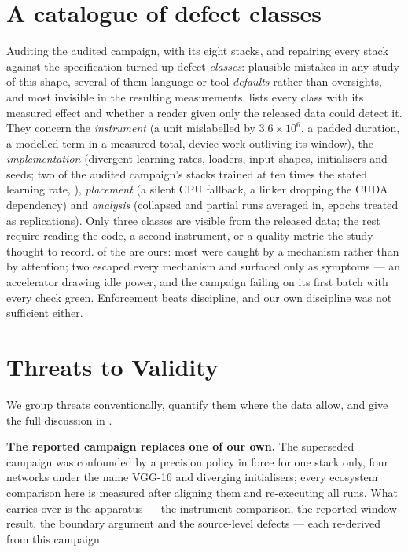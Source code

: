 \section{A catalogue of defect classes}
\label{sec:catalogue}

Auditing the audited campaign, with its eight stacks, and repairing every stack against the
specification turned up \vDefectCount{} defect \emph{classes}: plausible
mistakes in any study of this shape, several of them language or tool
\emph{defaults} rather than oversights, and most invisible in the resulting
measurements.  lists every class with its
measured effect and whether a reader given only the released data could detect
it. They concern the \emph{instrument} (a unit mislabelled by
\(3.6\times10^{6}\), a padded duration, a modelled term in a measured total,
device work outliving its window), the \emph{implementation} (divergent learning
rates, loaders, input shapes, initialisers and seeds; two of the audited
campaign's stacks trained at ten times the stated learning rate,
), \emph{placement} (a silent CPU fallback, a linker
dropping the CUDA dependency) and \emph{analysis} (collapsed and partial runs
averaged in, epochs treated as replications). Only three classes are visible
from the released data; the rest require reading the code, a second
instrument, or a quality metric the study thought to record. \vDefectOurs{} of
the \vDefectCount{} are ours: most were caught by a mechanism rather than by
attention; two escaped every mechanism and surfaced only as symptoms --- an
accelerator drawing idle power, and the campaign failing on its first batch
with every check green. Enforcement
beats discipline, and our own discipline was not sufficient either.

\section{Threats to Validity}
\label{sec:threats}

We group threats conventionally, quantify them where the data allow, and give
the full discussion in .

\textbf{The reported campaign replaces one of our own.} The superseded
campaign was confounded by a precision policy in force for one stack only, four
networks under the name VGG-16 and diverging initialisers; every ecosystem
comparison here is measured after aligning them and re-executing all \vRuns{}
runs. What carries over is the apparatus --- the instrument comparison, the
reported-window result, the boundary argument and the source-level defects ---
each re-derived from this campaign.


